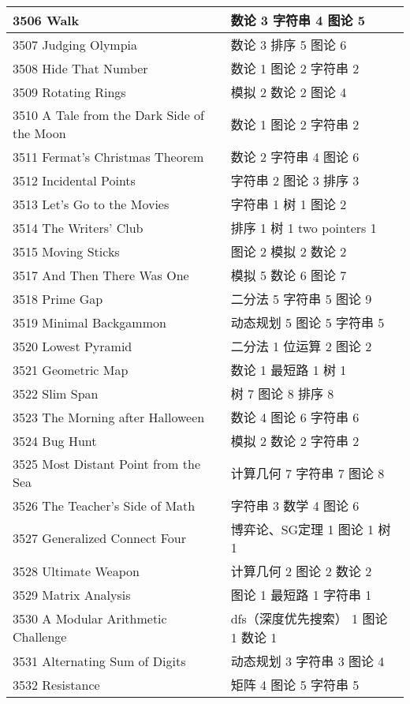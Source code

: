 \begin{longtable}{| p{} | p{} |}
 3506 Walk  & 数论 3 字符串 4 图论 5 \\ \hline
 3507 Judging Olympia  & 数论 3 排序 5 图论 6 \\ \hline
 3508 Hide That Number  & 数论 1 图论 2 字符串 2 \\ \hline
 3509 Rotating Rings  & 模拟 2 数论 2 图论 4 \\ \hline
 3510 A Tale from the Dark Side of the Moon  & 数论 1 图论 2 字符串 2 \\ \hline
 3511 Fermat's Christmas Theorem  & 数论 2 字符串 4 图论 6 \\ \hline
 3512 Incidental Points  & 字符串 2 图论 3 排序 3 \\ \hline
 3513 Let's Go to the Movies  & 字符串 1 树 1 图论 2 \\ \hline
 3514 The Writers' Club  & 排序 1 树 1 two pointers 1 \\ \hline
 3515 Moving Sticks  & 图论 2 模拟 2 数论 2 \\ \hline
 3517 And Then There Was One  & 模拟 5 数论 6 图论 7 \\ \hline
 3518 Prime Gap  & 二分法 5 字符串 5 图论 9 \\ \hline
 3519 Minimal Backgammon  & 动态规划 5 图论 5 字符串 5 \\ \hline
 3520 Lowest Pyramid  & 二分法 1 位运算 2 图论 2 \\ \hline
 3521 Geometric Map  & 数论 1 最短路 1 树 1 \\ \hline
 3522 Slim Span  & 树 7 图论 8 排序 8 \\ \hline
 3523 The Morning after Halloween  & 数论 4 图论 6 字符串 6 \\ \hline
 3524 Bug Hunt  & 模拟 2 数论 2 字符串 2 \\ \hline
 3525 Most Distant Point from the Sea  & 计算几何 7 字符串 7 图论 8 \\ \hline
 3526 The Teacher’s Side of Math  & 字符串 3 数学 4 图论 6 \\ \hline
 3527 Generalized Connect Four  & 博弈论、SG定理 1 图论 1 树 1 \\ \hline
 3528 Ultimate Weapon  & 计算几何 2 图论 2 数论 2 \\ \hline
 3529 Matrix Analysis  & 图论 1 最短路 1 字符串 1 \\ \hline
 3530 A Modular Arithmetic Challenge  & dfs（深度优先搜索） 1 图论 1 数论 1 \\ \hline
 3531 Alternating Sum of Digits  & 动态规划 3 字符串 3 图论 4 \\ \hline
 3532 Resistance  & 矩阵 4 图论 5 字符串 5 \\ \hline

\end{longtable}
